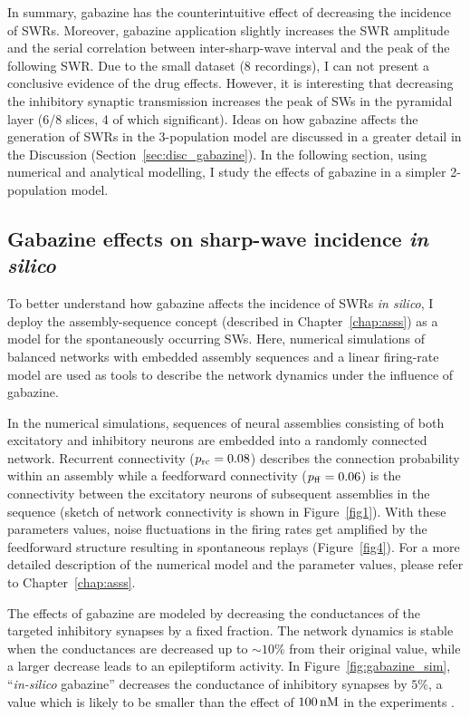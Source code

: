     In summary, gabazine has the counterintuitive effect of decreasing the
    incidence of SWRs. Moreover, gabazine application slightly increases the SWR
    amplitude and the serial correlation between inter-sharp-wave interval and
    the peak of the following SWR. Due to the small dataset (8 recordings), I
    can not present a conclusive evidence of the drug effects. However, it is
    interesting that decreasing the inhibitory synaptic transmission increases
    the peak of SWs in the pyramidal layer (6/8 slices, 4 of which
    significant). Ideas on how gabazine affects the generation of SWRs in the
    3-population model are discussed in a greater detail in the Discussion
    (Section~\ref{sec:disc_gabazine}). In the following section, using
    numerical and analytical modelling, I study the effects of gabazine in a
    simpler 2-population model.

  \subsection{Gabazine effects on sharp-wave incidence {\textit {in silico} }}
    \label{sec:gabazine_insilico}
    To better understand how gabazine affects the incidence of SWRs {\textit
    {in silico}}, I deploy the assembly-sequence concept (described in
    Chapter~\ref{chap:asss}) as a model for the spontaneously occurring
    SWs. Here, numerical simulations of balanced networks with embedded
    assembly sequences and a linear firing-rate model are used as tools to
    describe the network dynamics under the influence of gabazine.
      
    In the numerical simulations, sequences of neural assemblies consisting of
    both excitatory and inhibitory neurons are embedded into a randomly
    connected network. Recurrent connectivity ($p_{\rm rc}=0.08$) describes the
    connection probability within an assembly while a feedforward connectivity
    ($p_{\rm ff}=0.06$) is the connectivity between the excitatory neurons of
    subsequent assemblies in the sequence (sketch of network connectivity is
    shown in Figure~\ref{fig1}). With these parameters values, noise
    fluctuations in the firing rates get amplified by the feedforward structure
    resulting in spontaneous replays (Figure~\ref{fig4}). For a more
    detailed description of the numerical model and the parameter values,
    please refer to Chapter~\ref{chap:asss}.
    
    The effects of gabazine are modeled by decreasing the conductances of the
    targeted inhibitory synapses by a fixed fraction. The network dynamics is
    stable when the conductances are decreased up to $\sim 10\%$ from their
    original value, while a larger decrease leads to an epileptiform activity.
    In Figure~\ref{fig:gabazine_sim}, ``\textit{in-silico} gabazine'' decreases
    the conductance of inhibitory synapses by $5\%$, a value which is likely to
    be smaller than the effect of $100\,\rm nM$ in the experiments
    \citep{Nimmrich2005}.

